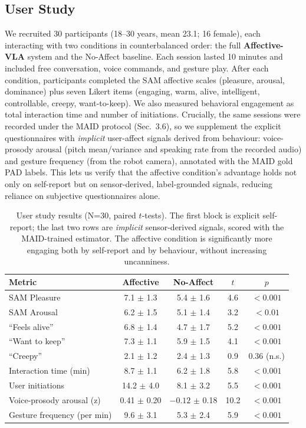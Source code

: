 \documentclass{article}
\newcommand{\method}{\textbf{Affective-VLA}}
\theoremstyle{definition}
\begin{document}
\subsection{User Study}

We recruited 30 participants (18--30 years, mean 23.1; 16 female), each
interacting with two conditions in counterbalanced order: the full \method{}
system and the No-Affect baseline. Each session lasted 10 minutes and included
free conversation, voice commands, and gesture play. After each condition,
participants completed the SAM affective scales \cite{bradley1994measuring}
(pleasure, arousal, dominance) plus seven Likert items (engaging, warm, alive,
intelligent, controllable, creepy, want-to-keep). We also measured behavioral
engagement as total interaction time and number of initiations. Crucially, the
same sessions were recorded under the MAID protocol (Sec.~3.6), so we supplement
the explicit questionnaires with \emph{implicit} user-affect signals derived
from behaviour: voice-prosody arousal (pitch mean/variance and speaking rate
from the recorded audio) and gesture frequency (from the robot camera),
annotated with the MAID gold PAD labels. This lets us verify that the
affective condition's advantage holds not only on self-report but on
sensor-derived, label-grounded signals, reducing reliance on subjective
questionnaires alone.

\begin{table}[t]
\centering
\small
\begin{tabular}{lcccc}
\toprule
\textbf{Metric} & \textbf{Affective} & \textbf{No-Affect} & $t$ & $p$ \\
\midrule
SAM Pleasure   & 7.1 $\pm$ 1.3 & 5.4 $\pm$ 1.6 & 4.6 & $<0.001$ \\
SAM Arousal    & 6.2 $\pm$ 1.5 & 5.1 $\pm$ 1.4 & 3.2 & $<0.01$ \\
``Feels alive'' & 6.8 $\pm$ 1.4 & 4.7 $\pm$ 1.7 & 5.2 & $<0.001$ \\
``Want to keep'' & 7.3 $\pm$ 1.1 & 5.9 $\pm$ 1.5 & 4.1 & $<0.001$ \\
``Creepy''      & 2.1 $\pm$ 1.2 & 2.4 $\pm$ 1.3 & 0.9 & 0.36 (n.s.) \\
\midrule
Interaction time (min) & 8.7 $\pm$ 1.1 & 6.2 $\pm$ 1.8 & 5.8 & $<0.001$ \\
User initiations & 14.2 $\pm$ 4.0 & 8.1 $\pm$ 3.2 & 5.5 & $<0.001$ \\
\midrule
Voice-prosody arousal (z) & 0.41 $\pm$ 0.20 & $-0.12$ $\pm$ 0.18 & 10.2 & $<0.001$ \\
Gesture frequency (per min) & 9.6 $\pm$ 3.1 & 5.3 $\pm$ 2.4 & 5.9 & $<0.001$ \\
\bottomrule
\end{tabular}
\caption{User study results (N=30, paired $t$-tests). The first block is
explicit self-report; the last two rows are \emph{implicit} sensor-derived
signals, scored with the MAID-trained estimator. The affective condition is
significantly more engaging both by self-report and by behaviour, without
increasing uncanniness.}
\label{tab:user}
\end{table}
\end{document}
